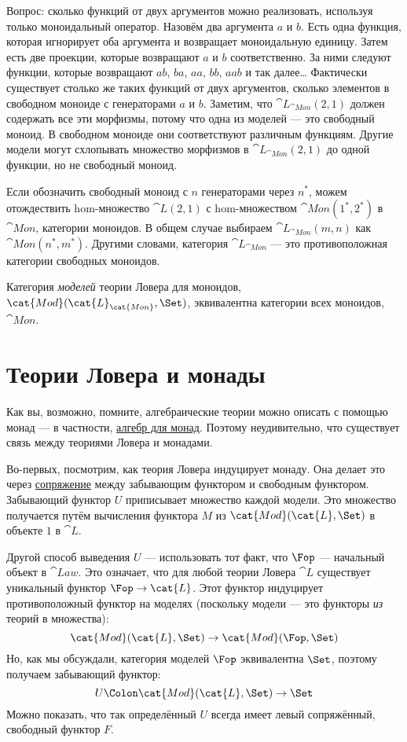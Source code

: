 Вопрос: сколько функций от двух аргументов можно реализовать,
используя только моноидальный оператор. Назовём два аргумента
$a$ и $b$. Есть одна функция, которая игнорирует оба
аргумента и возвращает моноидальную единицу. Затем есть две проекции,
которые возвращают $a$ и $b$ соответственно. За ними следуют
функции, которые возвращают $ab$, $ba$, $aa$,
$bb$, $aab$ и так далее\ldots{} Фактически существует столько же
таких функций от двух аргументов, сколько элементов в свободном моноиде
с генераторами $a$ и $b$. Заметим, что
$\cat{L}_{\cat{Mon}}(2, 1)$ должен содержать все эти морфизмы, потому что одна из
моделей — это свободный моноид. В свободном моноиде они соответствуют различным
функциям. Другие модели могут схлопывать множество морфизмов в
$\cat{L}_{\cat{Mon}}(2, 1)$ до одной функции, но не свободный моноид.

Если обозначить свободный моноид с $n$ генераторами через $n^*$, можем
отождествить hom-множество $\cat{L}(2, 1)$ с hom-множеством
$\cat{Mon}(1^*, 2^*)$ в $\cat{Mon}$, категории моноидов. В
общем случае выбираем $\cat{L}_{\cat{Mon}}(m, n)$ как $\cat{Mon}(n^*, m^*)$. Другими
словами, категория $\cat{L}_{\cat{Mon}}$ — это противоположная категории
свободных моноидов.

Категория \emph{моделей} теории Ловера для моноидов,\\
$\cat{Mod}(\cat{L}_{\cat{Mon}}, \Set)$, эквивалентна категории всех моноидов,
$\cat{Mon}$.

\section{Теории Ловера и монады}

Как вы, возможно, помните, алгебраические теории можно описать с помощью монад
--- в частности,
\hyperref[algebras-for-monads]{алгебр
  для монад}. Поэтому неудивительно, что существует связь
между теориями Ловера и монадами.

Во-первых, посмотрим, как теория Ловера индуцирует монаду. Она делает это
через
\hyperref[free-forgetful-adjunctions]{сопряжение}
между забывающим функтором и свободным функтором. Забывающий функтор
$U$ приписывает множество каждой модели. Это множество получается путём вычисления
функтора $M$ из $\cat{Mod}(\cat{L}, \Set)$ в объекте $1$ в
$\cat{L}$.

Другой способ выведения $U$ — использовать тот факт, что
$\Fop$ — начальный объект в $\cat{Law}$. Это
означает, что для любой теории Ловера $\cat{L}$ существует уникальный
функтор $\Fop \to \cat{L}$. Этот функтор индуцирует
противоположный функтор на моделях (поскольку модели — это функторы \emph{из}
теорий в множества):
\[\cat{Mod}(\cat{L}, \Set) \to \cat{Mod}(\Fop, \Set)\]
Но, как мы обсуждали, категория моделей
$\Fop$ эквивалентна $\Set$, поэтому получаем
забывающий функтор:
\[U \Colon \cat{Mod}(\cat{L}, \Set) \to \Set\]
Можно показать, что так определённый $U$ всегда имеет левый сопряжённый,
свободный функтор $F$.

